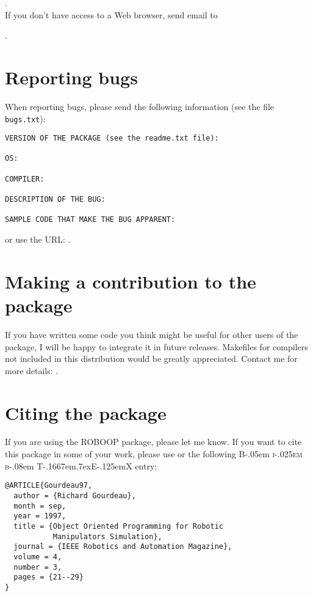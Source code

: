 \documentclass[dvips,11pt,fleqn]{report}
\begin{document}
{\tt {}}. \\
If you don't have access to a Web browser, send email to 

{\tt {}}.

\section{Reporting bugs}

When reporting bugs, please send the following information (see the file {\tt bugs.txt}):
\begin{verbatim}
VERSION OF THE PACKAGE (see the readme.txt file):

OS:

COMPILER:

DESCRIPTION OF THE BUG:

SAMPLE CODE THAT MAKE THE BUG APPARENT:

\end{verbatim}
or use the URL: {\tt {}}.


\section{Making a contribution to the package}

If you have written some code you think might be useful for other users of the package,
I will be happy to integrate it in future releases. Makefiles for compilers not included
in this distribution would be greatly appreciated. Contact me for more details: 
{\tt {}}.

\section{Citing the package}

If you are using the \textsf{ROBOOP} package, please let me know. If you want to cite this package
in some of your work, please use \cite{Gourdeau97} or the following {\rmfamily B\kern-.05em%
    \textsc{i\kern-.025em b}\kern-.08em%
    T\kern-.1667em\lower.7ex\hbox{E}\kern-.125emX} entry:
\begin{verbatim}
@ARTICLE{Gourdeau97,
  author = {Richard Gourdeau},
  month = sep,
  year = 1997,
  title = {Object Oriented Programming for Robotic
           Manipulators Simulation},
  journal = {IEEE Robotics and Automation Magazine},
  volume = 4,
  number = 3,
  pages = {21--29}
}
\end{verbatim}
\end{document}
